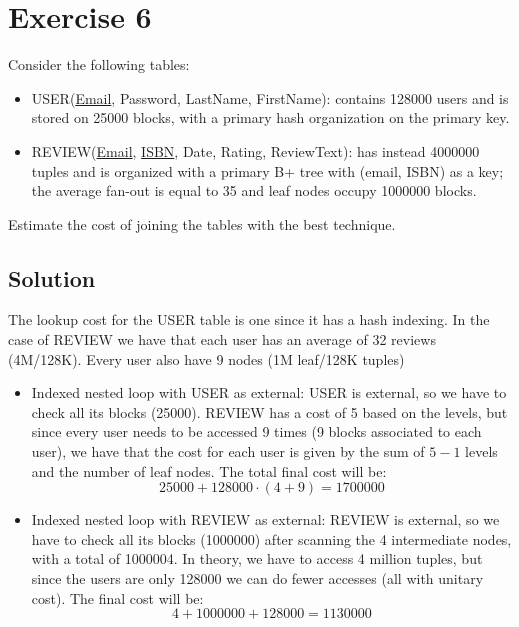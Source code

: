 \section{Exercise 6}

Consider the following tables: 
\begin{itemize}
    \item USER(\underline{Email}, Password, LastName, FirstName): contains 128000 users and is stored on 25000 blocks, with a primary hash organization on the primary key.
    \item REVIEW(\underline{Email}, \underline{ISBN}, Date, Rating, ReviewText): has instead 4000000 tuples and is organized with a primary B+ tree with (email, ISBN) as a key; the average fan-out is equal to 35 and leaf nodes occupy 1000000 blocks.
\end{itemize}
Estimate the cost of joining the tables with the best technique.

\subsection*{Solution}
The lookup cost for the USER table is one since it has a hash indexing. 
In the case of REVIEW we have that each user has an average of 32 reviews (4M/128K). 
Every user also have 9 nodes (1M leaf/128K tuples)
\begin{itemize}
    \item Indexed nested loop with USER as external:
        USER is external, so we have to check all its blocks (25000).
        REVIEW has a cost of 5 based on the levels, but since every user needs to be accessed 9 times (9 blocks associated to each user), we have that the cost for each user is given by the sum of $5-1$ levels and the number of leaf nodes. 
        The total final cost will be: 
        \[25000 + 128000 \cdot (4 + 9) = 1700000\]
    \item Indexed nested loop with REVIEW as external:
        REVIEW is external, so we have to check all its blocks (1000000) after scanning the 4 intermediate nodes, with a total of 1000004.
        In theory, we have to access 4 million tuples, but since the users are only 128000 we can do fewer accesses (all with unitary cost).
        The final cost will be: 
        \[4 + 1000000 + 128000 = 1130000\]
\end{itemize}